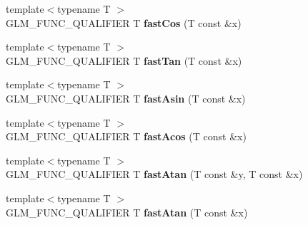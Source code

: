 \begin{DoxyCompactItemize}
\item 
{\footnotesize template$<$typename T $>$ }\\G\+L\+M\+\_\+\+F\+U\+N\+C\+\_\+\+Q\+U\+A\+L\+I\+F\+I\+ER T {\bfseries fast\+Cos} (T const \&x)\hypertarget{namespaceglm_a75d3c45e776390ea3aaf38de217adf62}{}\label{namespaceglm_a75d3c45e776390ea3aaf38de217adf62}

\item 
{\footnotesize template$<$typename T $>$ }\\G\+L\+M\+\_\+\+F\+U\+N\+C\+\_\+\+Q\+U\+A\+L\+I\+F\+I\+ER T {\bfseries fast\+Tan} (T const \&x)\hypertarget{namespaceglm_a04714ffbf278795bbaea183055c8f3e5}{}\label{namespaceglm_a04714ffbf278795bbaea183055c8f3e5}

\item 
{\footnotesize template$<$typename T $>$ }\\G\+L\+M\+\_\+\+F\+U\+N\+C\+\_\+\+Q\+U\+A\+L\+I\+F\+I\+ER T {\bfseries fast\+Asin} (T const \&x)\hypertarget{namespaceglm_ac914c7ac9fcae3a8ba92fada4669cf55}{}\label{namespaceglm_ac914c7ac9fcae3a8ba92fada4669cf55}

\item 
{\footnotesize template$<$typename T $>$ }\\G\+L\+M\+\_\+\+F\+U\+N\+C\+\_\+\+Q\+U\+A\+L\+I\+F\+I\+ER T {\bfseries fast\+Acos} (T const \&x)\hypertarget{namespaceglm_af69a053eff14e562570942b8cfdef8ba}{}\label{namespaceglm_af69a053eff14e562570942b8cfdef8ba}

\item 
{\footnotesize template$<$typename T $>$ }\\G\+L\+M\+\_\+\+F\+U\+N\+C\+\_\+\+Q\+U\+A\+L\+I\+F\+I\+ER T {\bfseries fast\+Atan} (T const \&y, T const \&x)\hypertarget{namespaceglm_a918c1605a7b1abdf7dec4fba88668dda}{}\label{namespaceglm_a918c1605a7b1abdf7dec4fba88668dda}

\item 
{\footnotesize template$<$typename T $>$ }\\G\+L\+M\+\_\+\+F\+U\+N\+C\+\_\+\+Q\+U\+A\+L\+I\+F\+I\+ER T {\bfseries fast\+Atan} (T const \&x)\hypertarget{namespaceglm_a8b063917e82ff3c023173548f226076e}{}\label{namespaceglm_a8b063917e82ff3c023173548f226076e}


\end{DoxyCompactItemize}

